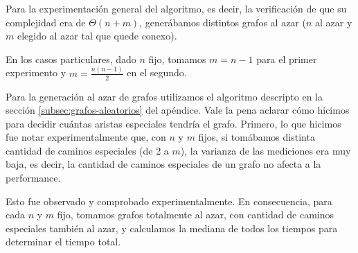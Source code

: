 Para la experimentación general del algoritmo, es decir, la verificación de que su complejidad era de $\Theta(n+m)$, generábamos distintos grafos al azar ($n$ al azar y $m$ elegido al azar tal que quede conexo).

En los casos particulares, dado $n$ fijo, tomamos $m = n - 1$ para el primer experimento y $m = \frac{n (n - 1)}{2}$ en el segundo.

Para la generación al azar de grafos utilizamos el algoritmo descripto en la sección \ref{subsec:grafos-aleatorios} del apéndice. Vale la pena aclarar cómo hicimos para decidir cuántas aristas especiales tendría el grafo. Primero, lo que hicimos fue notar experimentalmente que, con $n$ y $m$ fijos, si tomábamos distinta cantidad de caminos especiales (de 2 a $m$), la varianza de las mediciones era muy baja, es decir, la cantidad de caminos especiales de un grafo no afecta a la performance. 

Esto fue observado y comprobado experimentalmente. En consecuencia, para cada $n$ y $m$ fijo, tomamos grafos totalmente al azar, con cantidad de caminos especiales también al azar, y calculamos la mediana de todos los tiempos para determinar el tiempo total.
